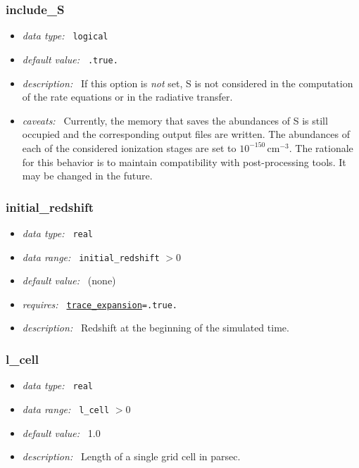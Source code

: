 \documentclass[a4paper,10pt]{article}
\begin{document}
\subsubsection{include\_S}
\label{opt:includes}
\begin{itemize}
 \item \textit{data type:~} \texttt{logical}
 \item \textit{default value:~} \texttt{.true.}
 \item \textit{description:~} If this option is 
 \textit{not} set, S is not considered 
 in the computation of the rate equations or in the
 radiative transfer. 
 \item \textit{caveats:~} Currently, the memory that saves the 
 abundances of S is still occupied and the corresponding output
 files are written. The abundances of each of the considered ionization
 stages are set to $10^{-150}\,\mathrm{cm^{-3}}$. The rationale for
 this behavior is to maintain compatibility with post-processing
 tools. It may be changed in the future.
\end{itemize}


\subsubsection{initial\_redshift}
\label{opt:initialredshift}
\begin{itemize}
 \item \textit{data type:~} \texttt{real}
 \item \textit{data range:~} \texttt{initial\_redshift} $> 0$
 \item \textit{default value:~} (none)
 \item \textit{requires:~} \texttt{\hyperref[opt:traceexpansion]{trace\_expansion}=.true.}
 \item \textit{description:~} Redshift at the beginning of the simulated time.
\end{itemize}


\subsubsection{l\_cell}
\label{opt:lcell}
\begin{itemize}
 \item \textit{data type:~} \texttt{real}
 \item \textit{data range:~} \texttt{l\_cell} $> 0$
 \item \textit{default value:~} 1.0
 \item \textit{description:~} Length of a single grid cell in parsec.
\end{itemize}
\end{document}
